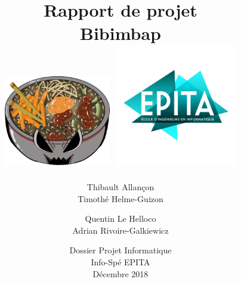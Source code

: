 \documentclass[12pt]{report}
\begin{document}
\title{
	{\vspace{4em}\Huge Rapport de projet}\\%
	{\large Bibimbap}\\%
    \protect\centering\protect\includegraphics[width=0.35\textwidth]{logo_bibimbap2}
    \protect\centering\protect\includegraphics[width=0.4\textwidth]{logo_epita}
}
\author{
	Thibault Allançon\\
	Timothé Helme-Guizon
	\and
	Quentin Le Helloco\\
	Adrian Rivoire-Galkiewicz}
\date{
    \vfill
	Dossier Projet Informatique\\
	Info-Spé EPITA\\
	Décembre 2018
}

\maketitle
\tableofcontents








\end{document}
